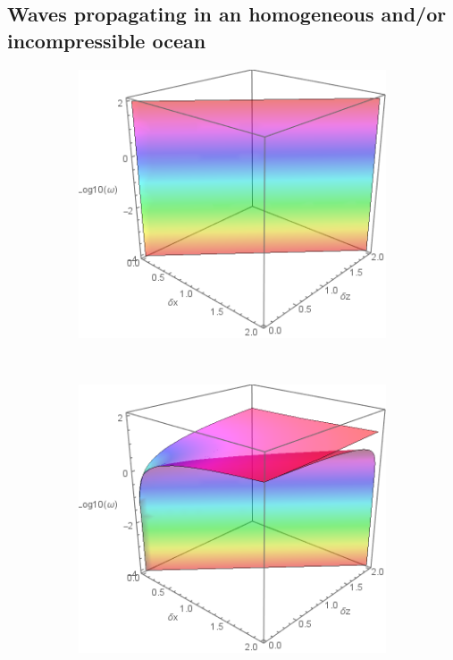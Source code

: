 \documentclass[a4paper,11pt]{article}
\begin{document}

\subsection{Waves propagating in an homogeneous and/or incompressible ocean}
\label{SubSectionHomogeneousIncomp}

\begin{figure}[!h]
	\centering		
	\begin{subfigure}{0.36\linewidth}
		\includegraphics[width=1\linewidth]{FIGURES/Disp_Full_inner_00.png}
		\caption{}
	\end{subfigure}
	~
	\centering		
	\begin{subfigure}{0.36\linewidth}
		\includegraphics[width=1\linewidth]{FIGURES/Disp_Full_inner_10.png}

\end{subfigure}
\end{figure}
\end{document}
